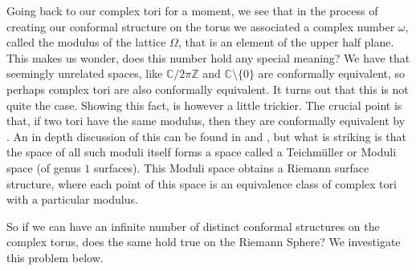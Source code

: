 \documentclass[11pt]{report}
\theoremstyle{definition}
\begin{document}
Going back to our complex tori for a moment, we see that in the process of creating our conformal structure on the torus we associated a complex number $\omega$, called the modulus of the lattice $\Omega$, that is an element of the upper half plane. This makes us wonder, does this number hold any special meaning? We have that seemingly unrelated spaces, like $\mathbb{C}/2\pi \mathbb{Z}$ and $\mathbb{C}\setminus \{0\}$ are conformally equivalent, so perhaps complex tori are also conformally equivalent. It turns out that this is not quite the case. Showing this fact, is however a little trickier.  The crucial point is that, if two tori have the same modulus, then they are conformally equivalent by \cite[(p.272, Theorem 6.1.4)]{comfun}. An in depth discussion of this can be found in \cite[(p.272, Section 6.1)]{comfun} and \cite[(p.91, Section 6.3.2)]{donaldson}, but what is striking is that the space of all such moduli itself forms a space called a Teichm\"{u}ller or Moduli space (of genus $1$ surfaces). This Moduli space obtains a Riemann surface structure, where each point of this space is an equivalence class of complex tori with a particular modulus.

So if we can have an infinite number of distinct conformal structures on the complex torus, does the same hold true on the Riemann Sphere? We investigate this problem below.
\end{document}
